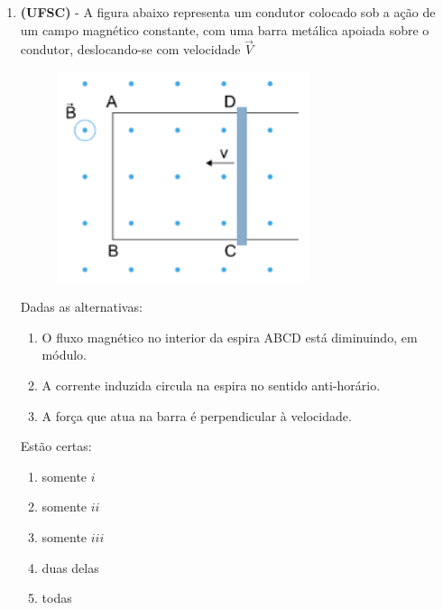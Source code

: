 \documentclass[12pt,letterpaper,fleqn]{article}
\begin{document}
    \begin{enumerate}
        \item \textbf{(UFSC)} - A figura abaixo representa um condutor colocado sob a ação de um campo magnético constante, com uma barra metálica apoiada sobre o condutor, deslocando-se com velocidade $\vec{V}$ 
        
        \begin{figure}[h]
            \centering
            \includegraphics[width=0.7\textwidth]{ex_1.png}
        \end{figure}
        
        Dadas as alternativas:
        \begin{enumerate}
        \begin{enumerate}
            \item  O fluxo magnético no interior da espira ABCD está diminuindo, em módulo.
            \item A corrente induzida circula na espira no sentido anti-horário.
            \item A força que atua na barra é perpendicular à velocidade.
        \end{enumerate}
        \end{enumerate}
        
        Estão certas:
        \begin{enumerate}
            \item somente $i$
            \item somente $ii$
            \item somente $iii$
            \item duas delas
            \item todas
        \end{enumerate}
        

\end{enumerate}
\end{document}

